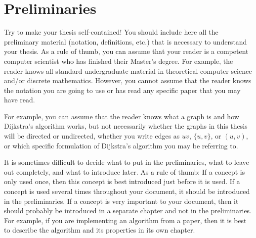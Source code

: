 \chapter{Preliminaries}

Try to make your thesis self-contained!
You should include here all the preliminary material (notation, definitions, etc.) that is necessary to understand your thesis.
As a rule of thumb, you can assume that your reader is a competent computer scientist who has finished their Master's degree.
For example, the reader knows all standard undergraduate material in theoretical computer science and/or discrete mathematics.
However, you cannot assume that the reader knows the notation you are going to use or has read any specific paper that you may have read.

For example, you can assume that the reader knows what a graph is and how Dijkstra's algorithm works, but not necessarily whether the graphs in this thesis will be directed or undirected, whether you write edges as $uv$, $\{u,v\}$, or $(u,v)$, or which specific formulation of Dijkstra's algorithm you may be referring to.

It is sometimes difficult to decide what to put in the preliminaries, what to leave out completely, and what to introduce later.
As a rule of thumb:
If a concept is only used once, then this concept is best introduced just before it is used.
If a concept is used several times throughout your document, it should be introduced in the preliminaries.
If a concept is very important to your document, then it should probably be introduced in a separate chapter and not in the preliminaries. For example, if you are implementing an algorithm from a paper, then it is best to describe the algorithm and its properties in its own chapter.
